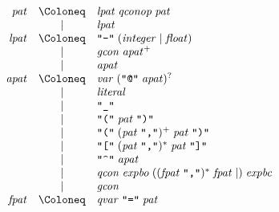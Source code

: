 \begin{align*}
  \begin{array}{rcl}
    \mathit{pat}
    & \Coloneq & \mathit{lpat}\; \mathit{qconop}\; \mathit{pat} \\
    & \mid & \mathit{lpat} \\
    \mathit{lpat}
    & \Coloneq & \text{\texttt{\textquotedbl -\textquotedbl}}\; (\mathit{integer} \mid \mathit{float}) \\
    & \mid & \mathit{gcon}\; \mathit{apat}^+ \\
    & \mid & \mathit{apat} \\
    \mathit{apat}
    & \Coloneq & \mathit{var}\; (\text{\texttt{\textquotedbl @\textquotedbl}}\; \mathit{apat})^? \\
    & \mid & \mathit{literal} \\
    & \mid & \text{\texttt{\textquotedbl\textunderscore\textquotedbl}} \\
    & \mid & \text{\texttt{\textquotedbl(\textquotedbl}}\; \mathit{pat}\; \text{\texttt{\textquotedbl)\textquotedbl}} \\
    & \mid & \text{\texttt{\textquotedbl(\textquotedbl}}\; (\mathit{pat}\; \text{\texttt{\textquotedbl,\textquotedbl}})^+\; \mathit{pat}\; \text{\texttt{\textquotedbl)\textquotedbl}} \\
    & \mid & \text{\texttt{\textquotedbl[\textquotedbl}}\; (\mathit{pat}\; \text{\texttt{\textquotedbl,\textquotedbl}})^*\; \mathit{pat}\; \text{\texttt{\textquotedbl]\textquotedbl}} \\
    & \mid & \text{\texttt{\textquotedbl\textasciicircum\textquotedbl}}\; \mathit{apat} \\
    & \mid & \mathit{qcon}\; \mathit{expbo}\; ((\mathit{fpat}\; \text{\texttt{\textquotedbl,\textquotedbl}})^*\; \mathit{fpat} \mid )\; \mathit{expbc} \\
    & \mid & \mathit{gcon} \\
    \mathit{fpat}
    & \Coloneq & \mathit{qvar}\; \text{\texttt{\textquotedbl =\textquotedbl}}\; \mathit{pat}
  \end{array}
\end{align*}

